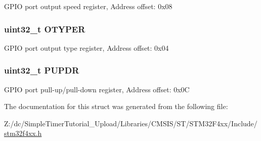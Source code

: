 G\-P\-I\-O port output speed register, Address offset\-: 0x08 \hypertarget{struct_g_p_i_o___type_def_a9543592bda60cb5261075594bdeedac9}{
\subsubsection[{O\-T\-Y\-P\-E\-R}]{ uint32\-\_\-t O\-T\-Y\-P\-E\-R}}\label{struct_g_p_i_o___type_def_a9543592bda60cb5261075594bdeedac9}
G\-P\-I\-O port output type register, Address offset\-: 0x04 \hypertarget{struct_g_p_i_o___type_def_abeed38529bd7b8de082e490e5d4f1727}{
\subsubsection[{P\-U\-P\-D\-R}]{ uint32\-\_\-t P\-U\-P\-D\-R}}\label{struct_g_p_i_o___type_def_abeed38529bd7b8de082e490e5d4f1727}
G\-P\-I\-O port pull-\/up/pull-\/down register, Address offset\-: 0x0\-C 

The documentation for this struct was generated from the following file\-:\begin{DoxyCompactItemize}
\item 
Z\-:/dc/\-Simple\-Timer\-Tutorial\-\_\-\-Upload/\-Libraries/\-C\-M\-S\-I\-S/\-S\-T/\-S\-T\-M32\-F4xx/\-Include/\hyperlink{stm32f4xx_8h}{stm32f4xx.\-h}\end{DoxyCompactItemize}
